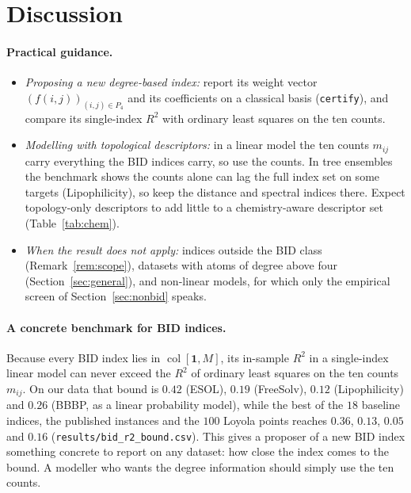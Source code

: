 \documentclass[11pt,a4paper]{article}
\theoremstyle{definition}
\newcommand{\col}{\operatorname{col}}
\begin{document}
\section{Discussion}\label{sec:discussion}

\paragraph{Practical guidance.}
\begin{itemize}
\item \emph{Proposing a new degree-based index:} report its weight
vector $(f(i,j))_{(i,j)\in P_4}$ and its coefficients on a classical
basis (\texttt{certify}), and compare its single-index $R^2$ with
ordinary least squares on the ten counts.
\item \emph{Modelling with topological descriptors:} in a linear model
the ten counts $m_{ij}$ carry everything the BID indices carry, so use
the counts. In tree ensembles the benchmark shows the counts alone can
lag the full index set on some targets (Lipophilicity), so keep the
distance and spectral indices there. Expect topology-only descriptors
to add little to a chemistry-aware descriptor set (Table~\ref{tab:chem}).
\item \emph{When the result does not apply:} indices outside the BID
class (Remark~\ref{rem:scope}), datasets with atoms of degree above four
(Section~\ref{sec:general}), and non-linear models, for which only the
empirical screen of Section~\ref{sec:nonbid} speaks.
\end{itemize}

\paragraph{A concrete benchmark for BID indices.} Because every BID
index lies in $\col[\mathbf 1,M]$, its in-sample $R^2$ in a
single-index linear model can never exceed the $R^2$ of ordinary least
squares on the ten counts $m_{ij}$. On our data that bound is $0.42$
(ESOL), $0.19$ (FreeSolv), $0.12$ (Lipophilicity) and $0.26$ (BBBP, as
a linear probability model), while the best of the $18$ baseline
indices, the \nCensusInst{} published instances and the $100$ Loyola points
reaches $0.36$, $0.13$, $0.05$ and $0.16$
(\texttt{results/bid\_r2\_bound.csv}). This gives a proposer of a new
BID index something concrete to report on any dataset: how close the
index comes to the bound. A modeller who wants the degree information
should simply use the ten counts.
\end{document}
